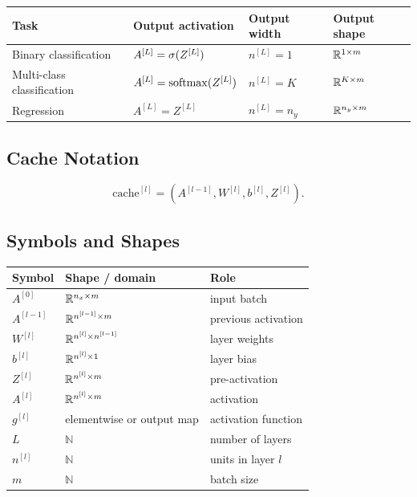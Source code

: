 \begin{center}
\begin{tabular}{llll}
\toprule
Task & Output activation & Output width & Output shape \\
\midrule
Binary classification & $A^{[L]}=\sigma(Z^{[L]})$ & $n^{[L]}=1$ & $\mathbb{R}^{1 \times m}$ \\
Multi-class classification & $A^{[L]}=\operatorname{softmax}(Z^{[L]})$ & $n^{[L]}=K$ & $\mathbb{R}^{K \times m}$ \\
Regression & $A^{[L]}=Z^{[L]}$ & $n^{[L]}=n_y$ & $\mathbb{R}^{n_y \times m}$ \\
\bottomrule
\end{tabular}
\end{center}

\subsection{Cache Notation}

\[
\mathrm{cache}^{[l]} =
\left(
A^{[l-1]}, W^{[l]}, b^{[l]}, Z^{[l]}
\right).
\]

\subsection{Symbols and Shapes}

\begin{center}
\begin{tabular}{lll}
\toprule
Symbol & Shape / domain & Role \\
\midrule
$A^{[0]}$ & $\mathbb{R}^{n_x \times m}$ & input batch \\
$A^{[l-1]}$ & $\mathbb{R}^{n^{[l-1]} \times m}$ & previous activation \\
$W^{[l]}$ & $\mathbb{R}^{n^{[l]} \times n^{[l-1]}}$ & layer weights \\
$b^{[l]}$ & $\mathbb{R}^{n^{[l]} \times 1}$ & layer bias \\
$Z^{[l]}$ & $\mathbb{R}^{n^{[l]} \times m}$ & pre-activation \\
$A^{[l]}$ & $\mathbb{R}^{n^{[l]} \times m}$ & activation \\
$g^{[l]}$ & elementwise or output map & activation function \\
$L$ & $\mathbb{N}$ & number of layers \\
$n^{[l]}$ & $\mathbb{N}$ & units in layer $l$ \\
$m$ & $\mathbb{N}$ & batch size \\
\bottomrule
\end{tabular}
\end{center}
